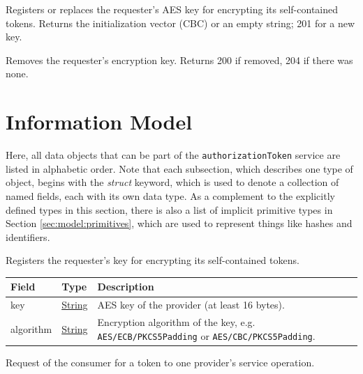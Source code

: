 \documentclass[a4paper]{arrowhead}
\newcommand{\pref}[1]{{\textcolor{ArrowheadGrey}{\hyperref[sec:model:primitives:#1]{#1}}}}
\begin{document}
Registers or replaces the requester's AES key for encrypting its self-contained tokens. Returns the initialization vector (CBC) or an empty string; 201 for a new key.


Removes the requester's encryption key. Returns 200 if removed, 204 if there was none.

\newpage

\section{Information Model}
\label{sec:model}

Here, all data objects that can be part of the \texttt{authorizationToken} service are listed in alphabetic order.
Note that each subsection, which describes one type of object, begins with the \textit{struct} keyword, which is used to denote a collection of named fields, each with its own data type.
As a complement to the explicitly defined types in this section, there is also a list of implicit primitive types in Section \ref{sec:model:primitives}, which are used to represent things like hashes and identifiers.


Registers the requester's key for encrypting its self-contained tokens.


\noindent\begin{tabularx}{\textwidth}{| >{\raggedright\arraybackslash}p{3.9cm} | >{\raggedright\arraybackslash\small}p{5.3cm} | X |} \hline
\rowcolor{gray!33} Field & Type & Description \\ \hline
key & \pref{String} & AES key of the provider (at least 16 bytes). \\ \hline
algorithm & \pref{String} & Encryption algorithm of the key, e.g. \texttt{AES/\allowbreak{}ECB/\allowbreak{}PKCS5Padding} or \texttt{AES/\allowbreak{}CBC/\allowbreak{}PKCS5Padding}. \\ \hline
\end{tabularx}




Request of the consumer for a token to one provider's service operation.
\end{document}
